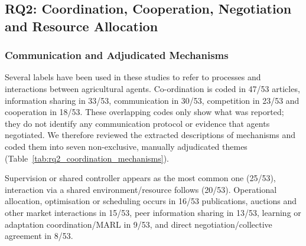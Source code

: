 \documentclass[11pt,a4paper]{article}
\begin{document}

\subsection{RQ2: Coordination, Cooperation, Negotiation and Resource Allocation}

\subsubsection{Communication and Adjudicated Mechanisms}

Several labels have been used in these studies to refer to processes and interactions between agricultural agents. Co-ordination is coded in 47/53 articles, information sharing in 33/53, communication in 30/53, competition in 23/53 and cooperation in 18/53. These overlapping codes only show what was reported; they do not identify any communication protocol or evidence that agents negotiated. We therefore reviewed the extracted descriptions of mechanisms and coded them into seven non-exclusive, manually adjudicated themes
(Table~\ref{tab:rq2_coordination_mechanisms}).  

Supervision or shared controller appears as the most common one (25/53),
interaction via a shared environment/resource follows (20/53). Operational
allocation, optimisation or scheduling occurs in 16/53 publications, 
auctions and other market interactions in 15/53, peer information sharing
in 13/53, learning or adaptation coordination/MARL in 9/53, and direct
negotiation/collective agreement in 8/53.
\end{document}
